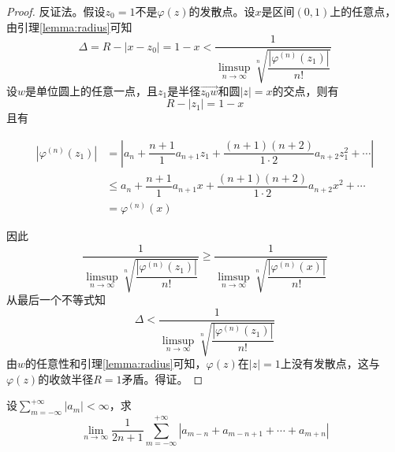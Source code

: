 \begin{proof}

    反证法。假设$z_0 = 1$不是$\varphi(z)$的发散点。设$x$是区间$(0, 1)$上的任意点，由引理\ref{lemma:radius}可知
    $$\Delta = R - |x - z_0| = 1 - x < \dfrac{1}{\limsup\limits_{n \to \infty}{\sqrt[n]{\dfrac{|\varphi^{(n)}(z_1)|}{n!}}}}$$
    设$w$是单位圆上的任意一点，且$z_1$是半径$\vec{z_0w}$和圆$|z| = x$的交点，则有
    $$R - |z_1| = 1 - x$$
    且有
    
    \begin{align*}
        |\varphi^{(n)}(z_1)| & = \left| a_n + \dfrac{n + 1}{1} a_{n + 1}z_1 + \dfrac{(n + 1)(n + 2)}{1 \cdot 2}a_{n + 2}z_1^2 + \cdots \right| \\
        & \leq a_n + \dfrac{n + 1}{1} a_{n + 1}x + \dfrac{(n + 1)(n + 2)}{1 \cdot 2}a_{n + 2}x^2 + \cdots \\
        & = \varphi^{(n)}(x)
    \end{align*}

    因此
    $$\dfrac{1}{\limsup\limits_{n \to \infty}{\sqrt[n]{\dfrac{|\varphi^{(n)}(z_1)|}{n!}}}} \geq \dfrac{1}{\limsup\limits_{n \to \infty}{\sqrt[n]{\dfrac{|\varphi^{(n)}(x)|}{n!}}}}$$
    从最后一个不等式知
    $$\Delta < \dfrac{1}{\limsup\limits_{n \to \infty}{\sqrt[n]{\dfrac{|\varphi^{(n)}(z_1)|}{n!}}}}$$
    由$w$的任意性和引理\ref{lemma:radius}可知，$\varphi(z)$在$|z| = 1$上没有发散点，这与$\varphi(z)$的收敛半径$R = 1$矛盾。得证。

\end{proof}

\begin{proposition}

    设$\sum\limits_{m = -\infty}^{+\infty}{|a_m|} < \infty$，求
    $$\lim\limits_{n \to \infty}{\dfrac{1}{2n + 1}\sum\limits_{m = -\infty}^{+\infty}{|a_{m - n} + a_{m - n + 1} + \cdots + a_{m + n}|}}$$

\end{proposition}

